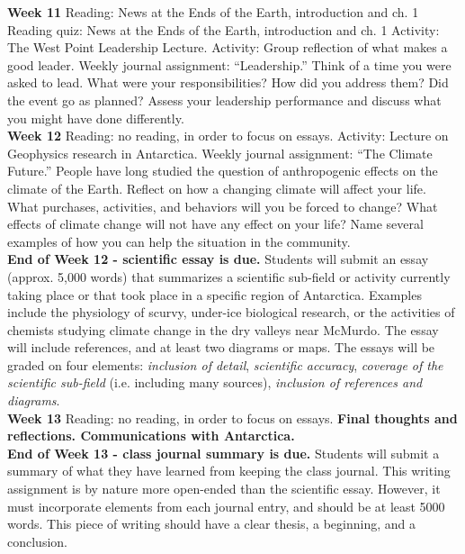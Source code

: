 \documentclass[10pt]{article}
\begin{document}
\begin{outline}[enumerate]
\1 \textbf{Week 11}
\2 Reading: News at the Ends of the Earth, introduction and ch. 1
\2 Reading quiz: News at the Ends of the Earth, introduction and ch. 1
\2 Activity: The West Point Leadership Lecture.
\2 Activity: Group reflection of what makes a good leader.
\2 Weekly journal assignment: ``Leadership.'' Think of a time you were asked to lead.  What were your responsibilities?  How did you address them?  Did the event go as planned?  Assess your leadership performance and discuss what you might have done differently. \\
\1 \textbf{Week 12}
\2 Reading: no reading, in order to focus on essays.
\2 Activity: Lecture on Geophysics research in Antarctica.
\2 Weekly journal assignment: ``The Climate Future.'' People have long studied the question of anthropogenic effects on the climate of the Earth.  Reflect on how a changing climate will affect your life.  What purchases, activities, and behaviors will you be forced to change?  What effects of climate change will not have any effect on your life?  Name several examples of how you can help the situation in the community. \\
\1 \textbf{End of Week 12 - scientific essay is due.} Students will submit an essay (approx. 5,000 words) that summarizes a scientific sub-field or activity currently taking place or that took place in a specific region of Antarctica.  Examples include the physiology of scurvy, under-ice biological research, or the activities of chemists studying climate change in the dry valleys near McMurdo.  The essay will include references, and at least two diagrams or maps.  The essays will be graded on four elements: \textit{inclusion of detail}, \textit{scientific accuracy}, \textit{coverage of the scientific sub-field} (i.e. including many sources), \textit{inclusion of references and diagrams}. \\
\1 \textbf{Week 13}
\2 Reading: no reading, in order to focus on essays.
\2 \textbf{Final thoughts and reflections.  Communications with Antarctica.} \\
\1 \textbf{End of Week 13 - class journal summary is due.} Students will submit a summary of what they have learned from keeping the class journal.  This writing assignment is by nature more open-ended than the scientific essay.  However, it must incorporate elements from each journal entry, and should be at least 5000 words.  This piece of writing should have a clear thesis, a beginning, and a conclusion.
\end{outline}
\end{document}
